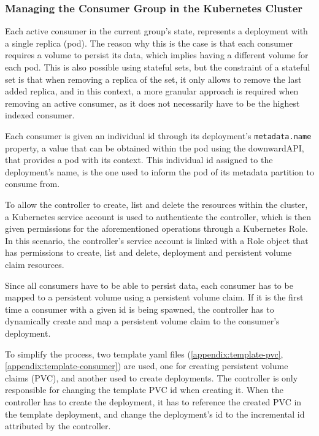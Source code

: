 \subsubsection{Managing the Consumer Group in the Kubernetes Cluster}

Each active consumer in the current group's state, represents a deployment with
a single replica (pod). The reason why this is the case is that each consumer
requires a volume to persist its data, which implies having a different volume
for each pod. This is also possible using stateful sets, but the constraint of a
stateful set is that when removing a replica of the set, it only allows to
remove the last added replica, and in this context, a more granular approach is
required when removing an active consumer, as it does not necessarily have to be
the highest indexed consumer.

Each consumer is given an individual id through its deployment's
\lstinline[language=Python]{metadata.name} property, a value that can be
obtained within the pod using the downwardAPI, that provides a pod with its
context. This individual id assigned to the deployment's name, is the one used
to inform the pod of its metadata partition to consume from.

To allow the controller to create, list and delete the resources within the
cluster, a Kubernetes service account is used to authenticate the controller,
which is then given permissions for the aforementioned operations through a
Kubernetes Role. In this scenario, the controller's service account is linked
with a Role object that has permissions to create, list and delete, deployment
and persistent volume claim resources.

Since all consumers have to be able to persist data, each consumer has to be
mapped to a persistent volume using a persistent volume claim. If it is the
first time a consumer with a given id is being spawned, the controller has to
dynamically create and map a persistent volume claim to the consumer's
deployment.

To simplify the process, two template yaml files (\ref{appendix:template-pvc},
\ref{appendix:template-consumer}) are used, one for creating persistent volume
claims (PVC), and another used to create deployments. The controller is only
responsible for changing the template PVC id when creating it. When the
controller has to create the deployment, it has to reference the created PVC in
the template deployment, and change the deployment's id to the incremental id
attributed by the controller.

